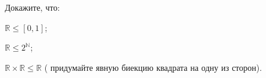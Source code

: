 Докажите, что:
\begin{enumcyr}
    \item $\mathbb{R} \le [0, 1]$;
    \item $\mathbb{R} \le 2^{\mathbb{N}}$;
    \item $\mathbb{R} \times \mathbb{R} \le \mathbb{R}$ ( придумайте явную биекцию
        квадрата на одну из сторон).
\end{enumcyr}